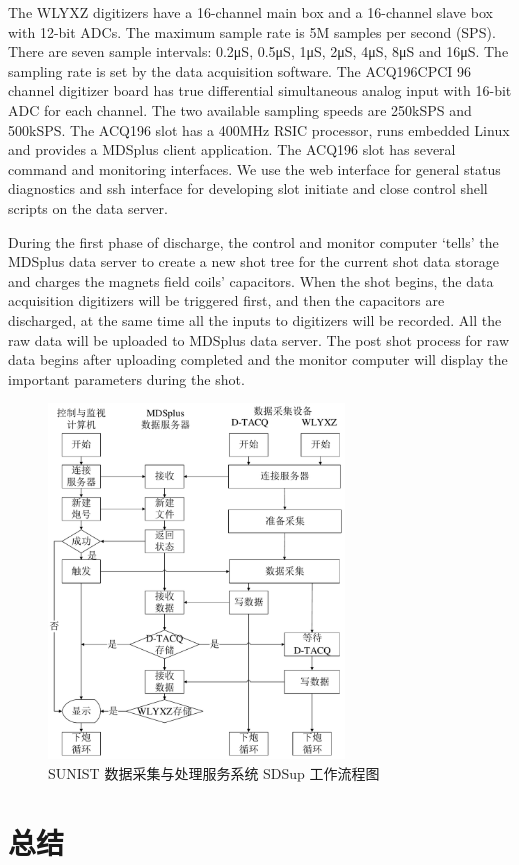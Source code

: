 The WLYXZ digitizers have a 16-channel main box and a 16-channel slave box with 12-bit ADCs. The maximum sample rate is 5M samples per second (SPS). There are seven sample intervals: 0.2μS, 0.5μS, 1μS, 2μS, 4μS, 8μS and 16μS. The sampling rate is set by the data acquisition software. The ACQ196CPCI 96 channel digitizer board has true differential simultaneous analog input with 16-bit ADC for each channel. The two available sampling speeds are 250kSPS and 500kSPS. The ACQ196 slot has a 400MHz RSIC processor, runs embedded Linux and provides a MDSplus client application. The ACQ196 slot has several command and monitoring interfaces. We use the web interface for general status diagnostics and ssh interface for developing slot initiate and close control shell scripts on the data server.

During the first phase of discharge, the control and monitor computer ‘tells’ the MDSplus data server to create a new shot tree for the current shot data storage and charges the magnets field coils’ capacitors. When the shot begins, the data acquisition digitizers will be triggered first, and then the capacitors are discharged, at the same time all the inputs to digitizers will be recorded. All the raw data will be uploaded to MDSplus data server. The post shot process for raw data begins after uploading completed and the monitor computer will display the important parameters during the shot.




\begin{figure}%
  \centering
  \includegraphics[width=0.7\textwidth]{SDSup-work-flow_cropped.pdf}
  \caption{SUNIST 数据采集与处理服务系统 SDSup 工作流程图}
  \label{fig:chap04:SDSup-work-flow}
\end{figure}

\section{总结}
